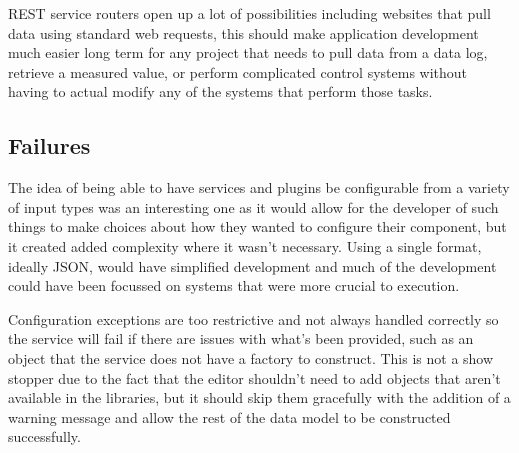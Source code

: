     REST service routers open up a lot of possibilities including websites that
    pull data using standard web requests, this should make application
    development much easier long term for any project that needs to pull data
    from a data log, retrieve a measured value, or perform complicated control
    systems without having to actual modify any of the systems that perform
    those tasks.

  \subsection{Failures}\label{sec:results-failures}

    The idea of being able to have services and plugins be configurable from a
    variety of input types was an interesting one as it would allow for the
    developer of such things to make choices about how they wanted to configure
    their component, but it created added complexity where it wasn't necessary.
    Using a single format, ideally JSON, would have simplified development and
    much of the development could have been focussed on systems that were more
    crucial to execution.

    Configuration exceptions are too restrictive and not always handled
    correctly so the service will fail if there are issues with what's been
    provided, such as an object that the service does not have a factory to
    construct. This is not a show stopper due to the fact that the editor
    shouldn't need to add objects that aren't available in the libraries, but
    it should skip them gracefully with the addition of a warning message and
    allow the rest of the data model to be constructed successfully.
